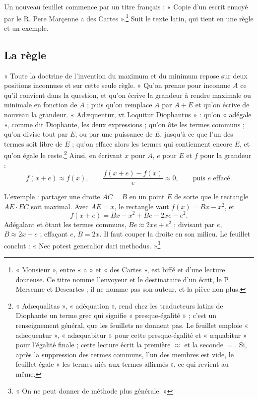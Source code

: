 \documentclass[11pt,a4paper]{article}
\begin{document}
Un nouveau feuillet commence par un titre français : « Copie d'un escrit enuoyé
par le R. Pere Marçenne a des Cartes ».\footnote{« Monsieur », entre « a » et
« des Cartes », est biffé et d'une lecture douteuse. Ce titre nomme l'envoyeur
et le destinataire d'un écrit, le P. Mersenne et Descartes ; il ne nomme pas
son auteur, et la pièce non plus.} Suit le texte latin, qui tient en une
règle et un exemple.

\subsection*{La règle}

« Toute la doctrine de l'invention du maximum et du minimum repose sur deux
positions inconnues et sur cette seule règle. » Qu'on prenne pour inconnue
$A$ ce qu'il convient dans la question, et qu'on écrive la grandeur à rendre
maximale ou minimale en fonction de $A$ ; puis qu'on remplace $A$ par $A + E$
et qu'on écrive de nouveau la grandeur. « Adæquentur, vt Loquitur Diophantus » :
qu'on « adégale », comme dit Diophante, les deux expressions ; qu'on ôte les
termes communs ; qu'on divise tout par $E$, ou par une puissance de $E$, jusqu'à
ce que l'un des termes soit libre de $E$ ; qu'on efface alors les termes qui
contiennent encore $E$, et qu'on égale le reste.\footnote{« Adæqualitas »,
« adéquation », rend chez les traducteurs latins de Diophante un terme grec qui
signifie « presque-égalité » ; c'est un renseignement général, que les feuillets
ne donnent pas. Le feuillet emploie « adæquentur », « adæquabitur » pour cette
presque-égalité et « æquabitur » pour l'égalité finale ; cette lecture écrit
la première $\approx$ et la seconde $=$. Si, après la suppression des termes
communs, l'un des membres est vide, le feuillet égale « les termes niés aux
termes affirmés », ce qui revient au même.} Ainsi, en écrivant $x$ pour $A$,
$e$ pour $E$ et $f$ pour la grandeur :
\[ f(x + e) \approx f(x), \qquad
   \frac{f(x+e) - f(x)}{e} \approx 0, \qquad
   \text{puis } e \text{ effacé}. \]

L'exemple : partager une droite $AC = B$ en un point $E$ de sorte que le
rectangle $AE\cdot EC$ soit maximal. Avec $AE = x$, le rectangle vaut
$f(x) = Bx - x^2$, et
\[ f(x + e) = Bx - x^2 + Be - 2xe - e^2 . \]
Adégalant et ôtant les termes communs, $Be \approx 2xe + e^2$ ; divisant par
$e$, $B \approx 2x + e$ ; effaçant $e$, $B = 2x$. Il faut couper la droite en
son milieu. Le feuillet conclut : « Nec potest generalior dari
methodus. »\footnote{« On ne peut donner de méthode plus générale. »}
\end{document}
